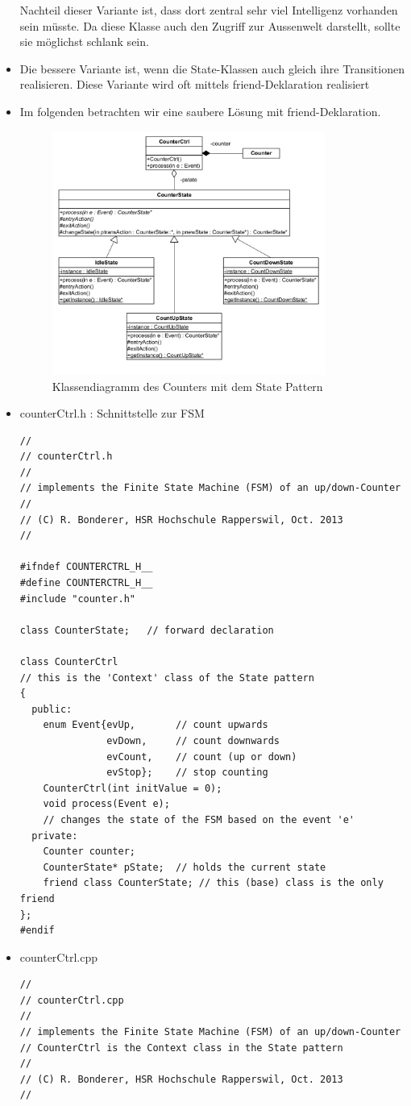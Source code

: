 \begin{itemize}
Nachteil dieser Variante ist, dass dort zentral sehr viel Intelligenz vorhanden
sein müsste. Da diese Klasse auch den Zugriff zur Aussenwelt darstellt, sollte
sie möglichst schlank sein.
\item Die bessere Variante ist, wenn die State-Klassen auch gleich ihre
Transitionen realisieren. Diese Variante wird oft mittels friend-Deklaration
realisiert
\item Im folgenden betrachten wir eine saubere Lösung mit friend-Deklaration.
 \begin{figure}[h]
  \centering
  {\includegraphics[height=8cm]{images/FSM/klassendiagramm}  
  \caption{Klassendiagramm des Counters mit dem State Pattern}
  \label{fig:klassendiagramm}}
\end{figure}
\item counterCtrl.h : Schnittstelle zur FSM
	\begin{lstlisting}[style=Cpp]
//
// counterCtrl.h
//
// implements the Finite State Machine (FSM) of an up/down-Counter
//
// (C) R. Bonderer, HSR Hochschule Rapperswil, Oct. 2013
//

#ifndef COUNTERCTRL_H__
#define COUNTERCTRL_H__
#include "counter.h"

class CounterState;   // forward declaration

class CounterCtrl
// this is the 'Context' class of the State pattern
{
  public:
    enum Event{evUp,       // count upwards
               evDown,     // count downwards
               evCount,    // count (up or down)
               evStop};    // stop counting
    CounterCtrl(int initValue = 0);
    void process(Event e);  
    // changes the state of the FSM based on the event 'e'
  private:
    Counter counter;
    CounterState* pState;  // holds the current state
    friend class CounterState; // this (base) class is the only friend
};
#endif
\end{lstlisting}
\item counterCtrl.cpp
	\begin{lstlisting}[style=Cpp]
//
// counterCtrl.cpp
//
// implements the Finite State Machine (FSM) of an up/down-Counter
// CounterCtrl is the Context class in the State pattern
//
// (C) R. Bonderer, HSR Hochschule Rapperswil, Oct. 2013
//


\end{lstlisting}
\end{itemize}
